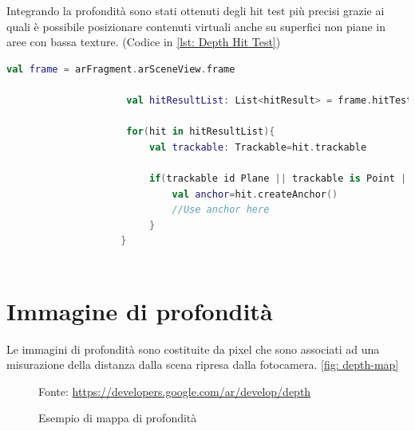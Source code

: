 \documentclass[crop=false, class=book]{standalone}
\begin{document}
		Integrando la profondità sono stati ottenuti degli hit test più precisi grazie ai quali è possibile  							posizionare contenuti virtuali anche su superfici non piane in aree con bassa texture. (Codice in \vref{lst: Depth Hit 			Test})\\

		\begin{center}
				\begin{minipage}{0.95\textwidth}
					\begin{lstlisting}[caption={Depth Hit Test}, label={lst: Depth Hit Test}, language=Kotlin]
					 val frame = arFragment.arSceneView.frame
					
					 val hitResultList: List<hitResult> = frame.hitTest(tap)
					
					 for(hit in hitResultList){
						 val trackable: Trackable=hit.trackable
						
						 if(trackable id Plane || trackable is Point || trackable is DepthPoint){
							 val anchor=hit.createAnchor()
							 //Use anchor here
						 }
					}
					
				\end{lstlisting}
			\end{minipage}
		\end{center}
		
		\section{Immagine di profondità}
		
		Le immagini di profondità sono costituite da pixel che sono associati ad una misurazione della distanza dalla scena 
		ripresa dalla fotocamera. \vref{fig: depth-map}
		
		\begin{figure}
				\centering
				{Fonte: \url{https://developers.google.com/ar/develop/depth}}
				\caption{Esempio di mappa di profondità}
				\label{fig: depth-map}
		\end{figure}	
		
\end{document}
